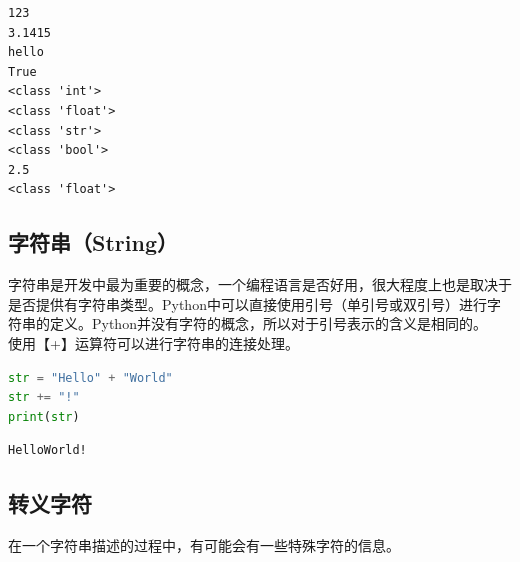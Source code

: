 \begin{tcolorbox}
	\begin{verbatim}
123
3.1415
hello
True
<class 'int'>
<class 'float'>
<class 'str'>
<class 'bool'>
2.5
<class 'float'>
\end{verbatim}
\end{tcolorbox}

\vspace{0.5cm}

\subsection{字符串（String）}

字符串是开发中最为重要的概念，一个编程语言是否好用，很大程度上也是取决于是否提供有字符串类型。Python中可以直接使用引号（单引号或双引号）进行字符串的定义。Python并没有字符的概念，所以对于引号表示的含义是相同的。\\

使用【+】运算符可以进行字符串的连接处理。\\


\begin{lstlisting}[language=Python]
str = "Hello" + "World"
str += "!"
print(str)
\end{lstlisting}

\begin{tcolorbox}
	\begin{verbatim}
HelloWorld!
\end{verbatim}
\end{tcolorbox}

\vspace{0.5cm}

\subsection{转义字符}

在一个字符串描述的过程中，有可能会有一些特殊字符的信息。

\begin{table}[H]
	\centering
	\caption{转义字符}
\end{table}

